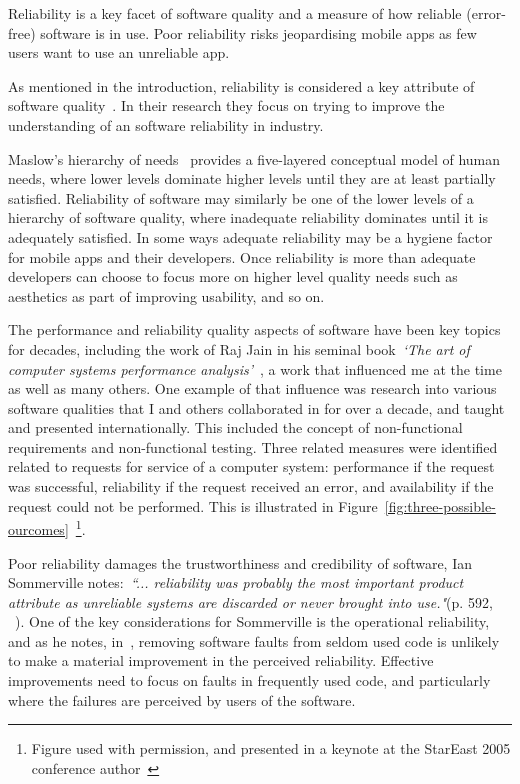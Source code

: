 Reliability is a key facet of software quality and a measure of how reliable (error-free) software is in use. Poor reliability risks jeopardising mobile apps as few users want to use an unreliable app. 

As mentioned in the introduction, reliability is considered a key attribute of software quality~\citep{febrero2017_software_reliability_as_user_perception}. In their research they focus on trying to improve the understanding of an software reliability in industry. 

Maslow's hierarchy of needs~\citep{wikipedia_maslows_hierarchy_of_needs} provides a five-layered conceptual model of human needs, where lower levels dominate higher levels until they are at least partially satisfied. Reliability of software may similarly be one of the lower levels of a hierarchy of software quality, where inadequate reliability dominates until it is adequately satisfied. In some ways adequate reliability may be a hygiene factor for mobile apps and their developers. Once reliability is more than adequate developers can choose to focus more on higher level quality needs such as aesthetics as part of improving usability, and so on.

The performance and reliability quality aspects of software have been key topics for decades, including the work of Raj Jain in his seminal book~\emph{`The art of computer systems performance analysis'}~\cite{jain1991art}, a work that influenced me at the time as well as many others. One example of that influence was research into various software qualities that I and others collaborated in for over a decade, and taught and presented internationally. This included the concept of non-functional requirements and non-functional testing. Three related measures were identified related to requests for service of a computer system: performance if the request was successful, reliability if the request received an error, and availability if the request could not be performed. This is illustrated in Figure~\ref{fig:three-possible-ourcomes}~\footnote{Figure used with permission, and presented in a keynote at the StarEast 2005 conference author~\cite{harty_stareast2005_keynote}}. 

Poor reliability damages the trustworthiness and credibility of software, Ian Sommerville notes:~\emph{``... reliability was probably the most important product attribute as unreliable systems are discarded or never brought into use."}(p. 592, ~\cite{sommerville1989_software_engineering}). One of the key considerations for Sommerville is the operational reliability, and as he notes, in~\cite{mills1987_cleanroom_software_engineering}, removing software faults from seldom used code is unlikely to make a material improvement in the perceived reliability. Effective improvements need to focus on faults in frequently used code, and particularly where the failures are perceived by users of the software.

